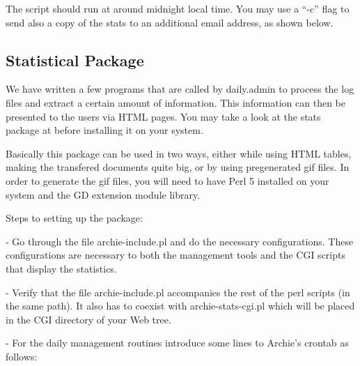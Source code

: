 



The script should run at around midnight local time. You may use a ``-c'' flag
to send also a copy of the stats to an additional email address, as shown
below.






\subsection{Statistical Package}

We have written a few programs that are called by daily.admin
to process the log files and extract a certain amount of information.
This information can then be presented to the users via HTML pages.
You may take a look at the stats package at
 before installing it on your
system.

        Basically this package can be used in two ways, either while
using HTML tables, making the transfered documents quite big, or by using
pregenerated gif files. In order to generate the gif files, you will need
to have Perl 5 installed on your system and the GD extension module library.


Steps to setting up the package:


  - Go through the file archie-include.pl and do the necessary
    configurations.  These configurations are necessary to both the
    management tools and the CGI scripts that display the statistics.

  - Verify that the file archie-include.pl accompanies the rest of the
    perl scripts (in the same path). It also has to coexist with
    archie-stats-cgi.pl which will be placed in the CGI directory of
    your Web tree.

  - For the daily management routines introduce some lines to Archie's
    crontab as follows:





